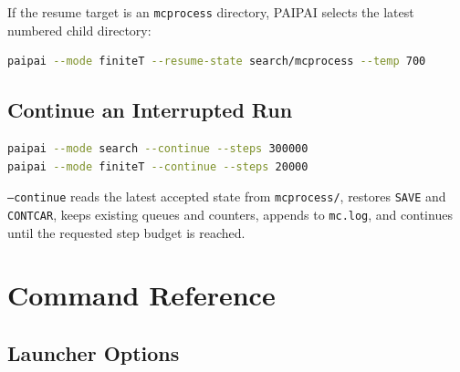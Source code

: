 \documentclass[11pt]{article}
\newcommand{\PAIPAI}{\textsc{PAIPAI}}
\begin{document}
If the resume target is an \texttt{mcprocess} directory, \PAIPAI{} selects the latest numbered child directory:

\begin{lstlisting}[language=bash]
paipai --mode finiteT --resume-state search/mcprocess --temp 700
\end{lstlisting}

\subsection{Continue an Interrupted Run}

\begin{lstlisting}[language=bash]
paipai --mode search --continue --steps 300000
paipai --mode finiteT --continue --steps 20000
\end{lstlisting}

\texttt{--continue} reads the latest accepted state from \texttt{mcprocess/}, restores \texttt{SAVE} and \texttt{CONTCAR}, keeps existing queues and counters, appends to \texttt{mc.log}, and continues until the requested step budget is reached.

\section{Command Reference}

\subsection{Launcher Options}
\end{document}
